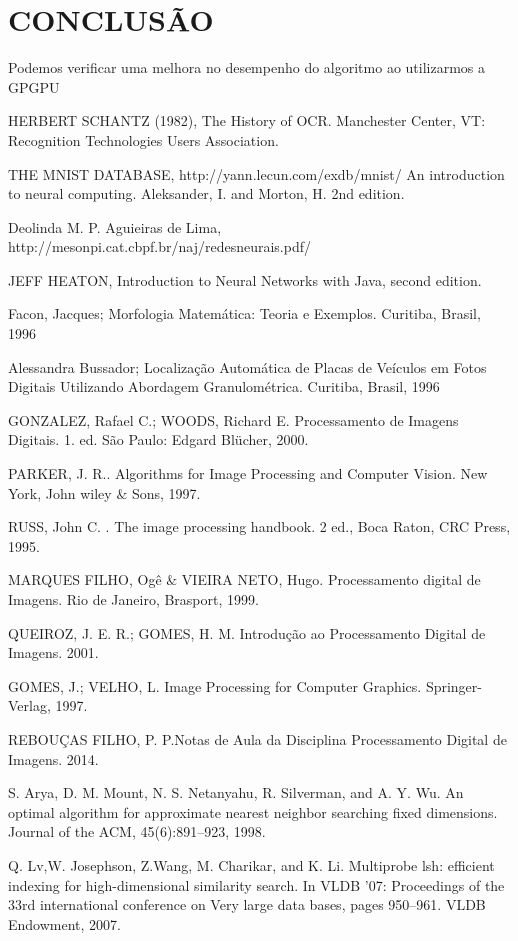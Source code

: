 \documentclass[letterpaper, 10 pt, conference]{ieeeconf}  %
\begin{document}
\section{CONCLUSÃO}
Podemos verificar uma melhora no desempenho do algoritmo ao utilizarmos a GPGPU 
\begin{thebibliography}{1}

HERBERT SCHANTZ (1982), The History of OCR. Manchester Center, VT: Recognition Technologies Users Association.

THE MNIST DATABASE, http://yann.lecun.com/exdb/mnist/ An introduction to neural computing. Aleksander, I. and Morton, H. 2nd edition.

Deolinda M. P. Aguieiras de Lima, http://mesonpi.cat.cbpf.br/naj/redesneurais.pdf/

JEFF HEATON, Introduction to Neural Networks with Java, second edition.

Facon, Jacques; Morfologia Matemática: Teoria e Exemplos. Curitiba,
 Brasil, 1996

 Alessandra Bussador; Localização Automática de Placas de Veículos em Fotos
Digitais Utilizando Abordagem Granulométrica. Curitiba,
 Brasil, 1996

GONZALEZ, Rafael C.; WOODS, Richard E. Processamento de Imagens Digitais. 1. ed. São Paulo: Edgard Blücher, 2000.

PARKER, J. R.. Algorithms for Image Processing and Computer Vision. New York, John wiley $ \& $ Sons, 1997. 

RUSS, John C. . The image processing handbook. 2 ed., Boca Raton, CRC Press, 1995.

MARQUES FILHO, Ogê $ \& $ VIEIRA NETO, Hugo. Processamento digital de Imagens. Rio de Janeiro, Brasport, 1999.

QUEIROZ, J. E. R.; GOMES, H. M. Introdução ao Processamento Digital de Imagens. 2001. 

GOMES, J.; VELHO, L. Image Processing for Computer Graphics. Springer-Verlag, 1997. 

REBOUÇAS FILHO, P. P.Notas de Aula da Disciplina Processamento Digital de Imagens. 2014. 

S. Arya, D. M. Mount, N. S. Netanyahu, R. Silverman, and A. Y. Wu. An optimal algorithm for approximate nearest neighbor searching fixed dimensions. Journal of the ACM, 45(6):891–923, 1998.

Q. Lv,W. Josephson, Z.Wang, M. Charikar, and K. Li. Multiprobe lsh: efficient indexing for high-dimensional similarity search. In VLDB ’07: Proceedings of the 33rd international conference on Very large data bases, pages 950–961. VLDB Endowment, 2007.

\end{thebibliography}
\end{document}
